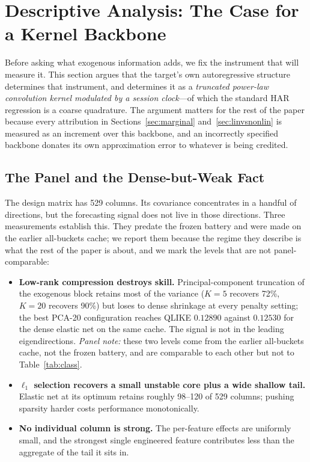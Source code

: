 \section{Descriptive Analysis: The Case for a Kernel Backbone}
\label{sec:descriptive}

Before asking what exogenous information adds, we fix the instrument that will
measure it. This section argues that the target's own autoregressive structure
determines that instrument, and determines it as a \emph{truncated power-law
convolution kernel modulated by a session clock}---of which the standard HAR
regression is a coarse quadrature. The argument matters for the rest of the
paper because every attribution in Sections~\ref{sec:marginal}
and~\ref{sec:linvsnonlin} is measured as an increment over this backbone, and
an incorrectly specified backbone donates its own approximation error to
whatever is being credited.

\subsection{The Panel and the Dense-but-Weak Fact}
\label{sec:dense_weak}

The design matrix has 529 columns. Its covariance concentrates in a handful of
directions, but the forecasting signal does not live in those directions. Three
measurements establish this. They predate the frozen battery and were made on
the earlier all-buckets cache; we report them because the regime they describe
is what the rest of the paper is about, and we mark the levels that are not
panel-comparable:

\begin{itemize}
  \item \textbf{Low-rank compression destroys skill.} Principal-component
    truncation of the exogenous block retains most of the variance
    ($K=5$ recovers 72\%, $K=20$ recovers 90\%) but loses to dense shrinkage at
    every penalty setting; the best PCA-20 configuration reaches QLIKE
    $0.12890$ against $0.12530$ for the dense elastic net on the same cache.
    The signal is not in the leading eigendirections. \emph{Panel note:} these
    two levels come from the earlier all-buckets cache, not the frozen battery,
    and are comparable to each other but not to Table~\ref{tab:class}.
  \item \textbf{$\ell_1$ selection recovers a small unstable core plus a wide
    shallow tail.} Elastic net at its optimum retains roughly 98--120 of 529
    columns; pushing sparsity harder costs performance monotonically.
  \item \textbf{No individual column is strong.} The per-feature effects are
    uniformly small, and the strongest single engineered feature contributes
    less than the aggregate of the tail it sits in.
\end{itemize}

